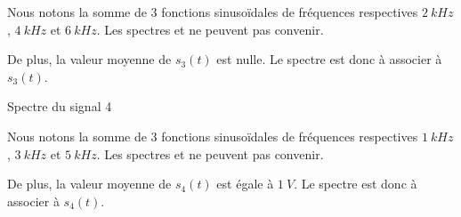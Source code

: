 \begin{corrige}
	Nous notons la somme de 3 fonctions sinusoïdales de fréquences respectives $\SI{2}{kHz}$, $\SI{4}{kHz}$ et 
	$\SI{6}{kHz}$. Les spectres \reponseB{} et \reponseC{} ne peuvent pas convenir. 
	
	De plus, la valeur moyenne de $s_3(t)$ est nulle. Le spectre \reponseD{} est donc à associer à  $s_3(t)$.
\end{corrige}



\begin{enonce}
	Spectre du signal \no{}4
\end{enonce}

\reponse{$\reponseB{}$}

\begin{corrige}
	Nous notons la somme de 3 fonctions sinusoïdales de fréquences respectives $\SI{1}{kHz}$, $\SI{3}{kHz}$ et 
	$\SI{5}{kHz}$. Les spectres \reponseA{} et \reponseD{} ne peuvent pas convenir. 
	
	De plus, la valeur moyenne de $s_4(t)$ est égale à $\SI{1}{V}$. Le spectre \reponseB{} est donc à associer à  $s_4(t)$.
\end{corrige}


\finEntrainement







 






